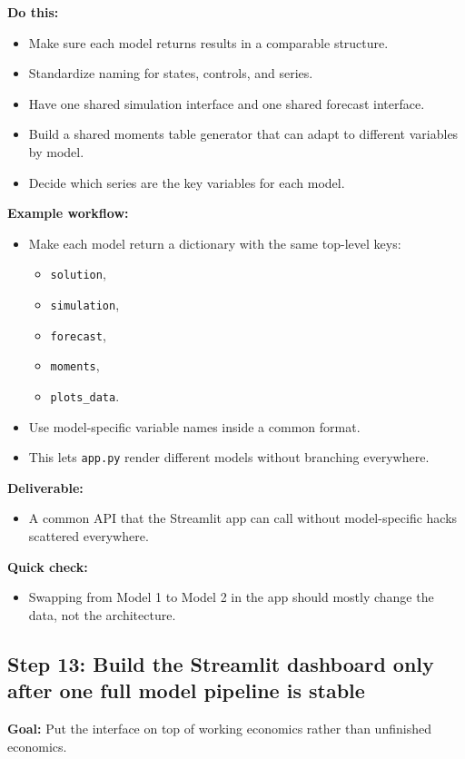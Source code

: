 \documentclass[11pt]{article}
\begin{document}
\textbf{Do this:}
\begin{itemize}
    \item Make sure each model returns results in a comparable structure.
    \item Standardize naming for states, controls, and series.
    \item Have one shared simulation interface and one shared forecast interface.
    \item Build a shared moments table generator that can adapt to different variables by model.
    \item Decide which series are the key variables for each model.
\end{itemize}

\textbf{Example workflow:}
\begin{itemize}
    \item Make each model return a dictionary with the same top-level keys:
    \begin{itemize}
        \item \verb|solution|,
        \item \verb|simulation|,
        \item \verb|forecast|,
        \item \verb|moments|,
        \item \verb|plots_data|.
    \end{itemize}
    \item Use model-specific variable names inside a common format.
    \item This lets \verb|app.py| render different models without branching everywhere.
\end{itemize}

\textbf{Deliverable:}
\begin{itemize}
    \item A common API that the Streamlit app can call without model-specific hacks scattered everywhere.
\end{itemize}

\textbf{Quick check:}
\begin{itemize}
    \item Swapping from Model 1 to Model 2 in the app should mostly change the data, not the architecture.
\end{itemize}

\subsection{Step 13: Build the Streamlit dashboard only after one full model pipeline is stable}
\textbf{Goal:} Put the interface on top of working economics rather than unfinished economics.
\end{document}
